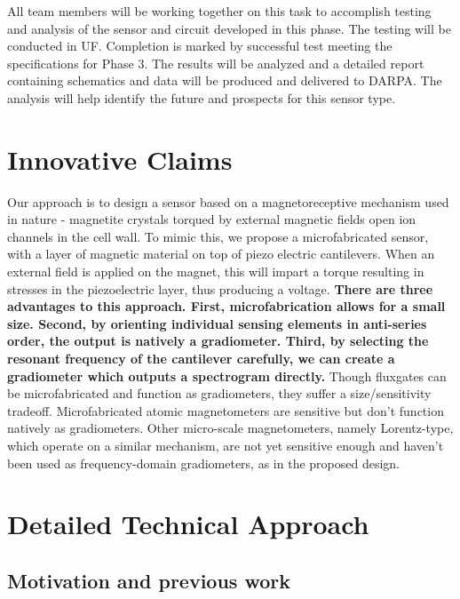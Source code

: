 All team members will be working together on this task to accomplish testing and analysis of the sensor and circuit developed in this phase. The testing will be conducted in UF. Completion is marked by successful test meeting the specifications for Phase 3. The results will be analyzed and a detailed report containing schematics and data will be produced and delivered to DARPA. The analysis will help identify the future and prospects for this sensor type.

\section{Innovative Claims}\label{sec:inno}

Our approach is to design a sensor based on a magnetoreceptive mechanism used in nature - magnetite crystals torqued by external magnetic fields open ion channels in the cell wall. To mimic this, we propose a microfabricated sensor, with a layer of magnetic material on top of piezo electric cantilevers. When an external field is applied on the magnet, this will impart a torque resulting in stresses in the piezoelectric layer, thus producing a voltage. \textbf{There are three advantages to this approach. First, microfabrication allows for a small size. Second, by orienting individual sensing elements in anti-series order, the output is natively a gradiometer. Third, by selecting the resonant frequency of the cantilever carefully, we can create a gradiometer which outputs a spectrogram directly.} Though fluxgates can be microfabricated and function as gradiometers, they suffer a size/sensitivity tradeoff. Microfabricated atomic magnetometers are sensitive but don't function natively as gradiometers. Other micro-scale magnetometers, namely Lorentz-type, which operate on a similar mechanism, are not yet sensitive enough and haven't been used as frequency-domain gradiometers, as in the proposed design.

\section{Detailed Technical Approach}

\subsection{Motivation and previous work}

